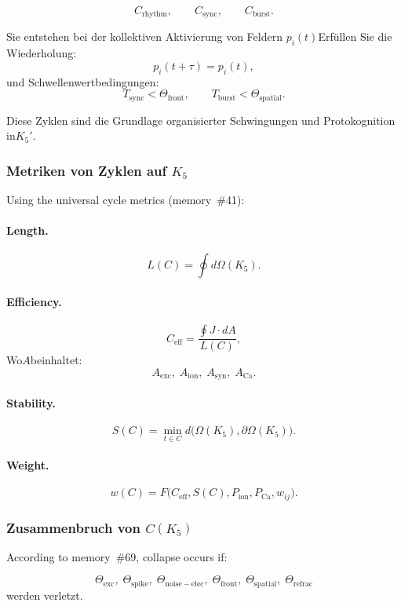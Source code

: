 \[
  C_{\mathrm{rhythm}},
  \qquad
  C_{\mathrm{sync}},
  \qquad
  C_{\mathrm{burst}}.
\]

Sie entstehen bei der kollektiven Aktivierung von Feldern
$p_i(t)$Erfüllen Sie die Wiederholung:
\[
  p_i(t+\tau) = p_i(t),
\]
und Schwellenwertbedingungen:
\[
  T_{\mathrm{sync}} < \Theta_{\mathrm{front}},\qquad
  T_{\mathrm{burst}} < \Theta_{\mathrm{spatial}}.
\]

Diese Zyklen sind die Grundlage organisierter Schwingungen und
Protokognition in$K_5'$.

\subsubsection{Metriken von Zyklen auf \texorpdfstring{$K_5$}{K_5}}

Using the universal cycle metrics (memory~\#41):

\paragraph{Length.}
\[
  L(C)=\oint d\Omega(K_5).
\]

\paragraph{Efficiency.}
\[
  C_{\mathrm{eff}}=\frac{\oint J\cdot dA}{L(C)},
\]
Wo$A$beinhaltet:
\[
  A_{\mathrm{exc}},\;
  A_{\mathrm{ion}},\;
  A_{\mathrm{syn}},\;
  A_{\mathrm{Ca}}.
\]

\paragraph{Stability.}
\[
S(C) =
    \min\limits_{t\in C}
      d\bigl(\Omega(K_5),\partial\Omega(K_5)\bigr).
\]

\paragraph{Weight.}
\[
w(C) =
    F\bigl(C_{\mathrm{eff}}, S(C), P_{\mathrm{ion}},
      P_{\mathrm{Ca}}, w_{ij}\bigr).
\]

\subsubsection{Zusammenbruch von \texorpdfstring{$C(K_5)$}{C(K_5)}}

According to memory~\#69, collapse occurs if:

\[
  \Theta_{\mathrm{exc}},\;
  \Theta_{\mathrm{spike}},\;
  \Theta_{\mathrm{noise-elec}},\;
  \Theta_{\mathrm{front}},\;
  \Theta_{\mathrm{spatial}},\;
  \Theta_{\mathrm{refrac}}
\]
werden verletzt.

